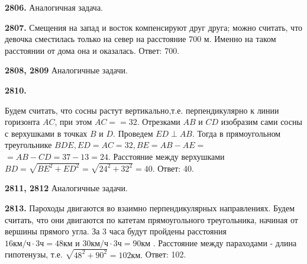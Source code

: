 \textbf{2806.} Аналогичная задача.

\textbf{2807.} Смещения на запад и восток компенсируют друг друга; можно считать, что девочка сместилась только на север на расстояние 700 м. Именно на таком расстоянии от дома она и оказалась.   \newline \null \hspace*{\fill} Ответ: 700. 

\textbf{2808, 2809} Аналогичные задачи.

\textbf{2810.}
\begin{figure}[h]
\end{figure}
Будем считать, что сосны растут вертикально,\newline т.е. перпендикулярно к линии горизонта $AC$, при этом $AC=$\newline$=32.$ Отрезками $AB$ и $CD$ изобразим сами сосны с верхушками в точках $B$ и $D$. Проведем $ED\perp AB$. Тогда в прямоугольном треугольнике $BDE, ED=AC=32, BE=AB-AE=$\newline$=AB-CD=37-13=24.$ Расстояние между верхушками $BD=\sqrt{BE^2 + ED^2}=\sqrt{24^2+32^2}=40.$ \newline \null \hspace*{\fill} Ответ: 40. 

\textbf{2811, 2812} Аналогичные задачи.

\textbf{2813.} Пароходы двигаются во взаимно перпендикулярных направлениях. Будем считать, что они двигаются по катетам прямоугольного треугольника, начиная от вершины прямого угла. За 3 часа будут пройдены расстояния $16\text{км/ч}\cdot3\text{ч}=48\text{км и }$\newline$30\text{км/ч}\cdot3\text{ч}=90\text{км .} $ Расстояние между параходами - длина гипотенузы, т.е. $\sqrt{48^2+90^2}=102\text{км.}$ \newline \null \hspace*{\fill} Ответ: 102. 

